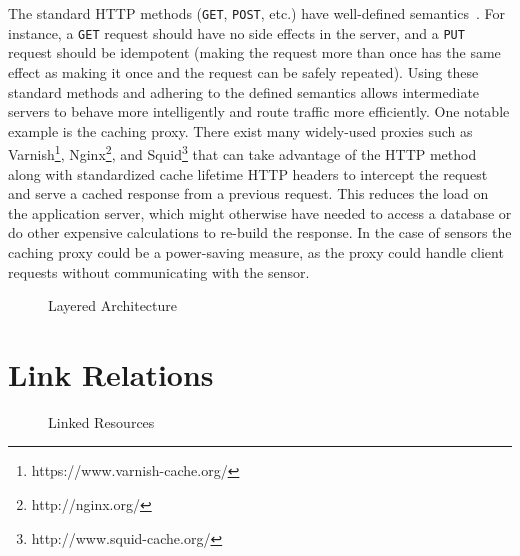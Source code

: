 \documentclass{acm_proc_article-sp}
\begin{document}
The standard HTTP methods (\texttt{GET}, \texttt{POST}, etc.) have well-defined
semantics~\cite{httpmethods}. For instance, a \texttt{GET} request should have
no side effects in the server, and a \texttt{PUT} request should be idempotent
(making the request more than once has the same effect as making it once and
the request can be safely repeated). Using these standard methods and adhering
to the defined semantics allows intermediate servers to behave more
intelligently and route traffic more efficiently. One notable example is the
caching proxy. There exist many widely-used proxies such as
Varnish\footnote{https://www.varnish-cache.org/},
Nginx\footnote{http://nginx.org/}, and
Squid\footnote{http://www.squid-cache.org/} that can take advantage of the HTTP
method along with standardized cache lifetime HTTP headers to intercept the
request and serve a cached response from a previous request. This reduces the
load on the application server, which might otherwise have needed to access a
database or do other expensive calculations to re-build the response. In the
case of sensors the caching proxy could be a power-saving measure, as the proxy
could handle client requests without communicating with the sensor.

\begin{figure}
    \centering
    
    \caption{Layered Architecture}
    \label{chain_distributed}
\end{figure}

\section{Link Relations}

\begin{figure}
    \centering
    
    \caption{Linked Resources}
    \label{hyperlinks}
\end{figure}
\end{document}
